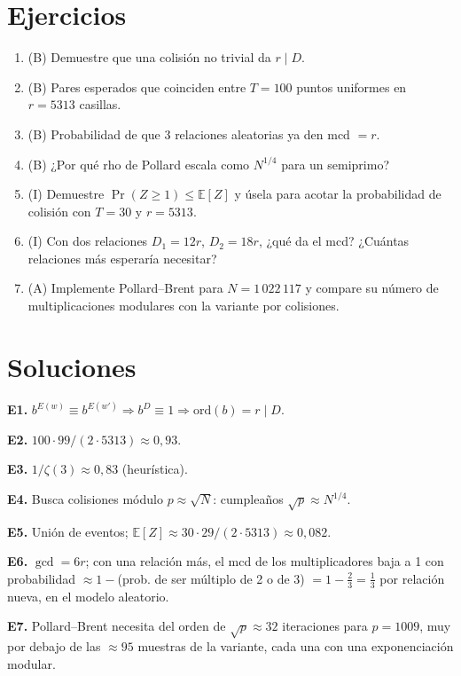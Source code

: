 \documentclass[11pt,a4paper]{article}
\begin{document}
\section{Ejercicios}
\begin{enumerate}[label=\textbf{E\arabic*.}]
\item (B) Demuestre que una colisión no trivial da $r\mid D$.
\item (B) Pares esperados que coinciden entre $T=100$ puntos uniformes en $r=5313$ casillas.
\item (B) Probabilidad de que 3 relaciones aleatorias ya den mcd $=r$.
\item (B) ¿Por qué rho de Pollard escala como $N^{1/4}$ para un semiprimo?
\item (I) Demuestre $\Pr(Z\ge1)\le\mathbb E[Z]$ y úsela para acotar la probabilidad de colisión con $T=30$ y $r=5313$.
\item (I) Con dos relaciones $D_1=12r$, $D_2=18r$, ¿qué da el mcd? ¿Cuántas relaciones más esperaría necesitar?
\item (A) Implemente Pollard--Brent para $N=1\,022\,117$ y compare su número de multiplicaciones modulares con la variante por colisiones.
\end{enumerate}
\section{Soluciones}
\begin{solucion}
\textbf{E1.} $b^{E(w)}\equiv b^{E(w')}\Rightarrow b^{D}\equiv1\Rightarrow\mathrm{ord}(b)=r\mid D$.

\textbf{E2.} $100\cdot99/(2\cdot5313)\approx0{,}93$.

\textbf{E3.} $1/\zeta(3)\approx0{,}83$ (heurística).

\textbf{E4.} Busca colisiones módulo $p\approx\sqrt N$: cumpleaños $\sqrt p\approx N^{1/4}$.

\textbf{E5.} Unión de eventos; $\mathbb E[Z]\approx30\cdot29/(2\cdot5313)\approx0{,}082$.

\textbf{E6.} $\gcd=6r$; con una relación más, el mcd de los multiplicadores baja a 1 con probabilidad $\approx1-$(prob. de ser múltiplo de 2 o de 3) $=1-\tfrac23=\tfrac13$ por relación nueva, en el modelo aleatorio.

\textbf{E7.} Pollard--Brent necesita del orden de $\sqrt p\approx32$ iteraciones para $p=1009$, muy por debajo de las $\approx95$ muestras de la variante, cada una con una exponenciación modular.
\end{solucion}
\end{document}
